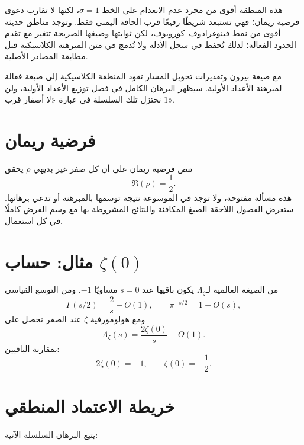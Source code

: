 هذه المنطقة أقوى من مجرد عدم الانعدام على الخط \(\sigma=1\)، لكنها
لا تقارب دعوى فرضية ريمان؛ فهي تستبعد شريطًا رفيعًا قرب الحافة اليمنى
فقط. وتوجد مناطق حديثة أقوى من نمط فينوغرادوف--كوروبوف، لكن ثوابتها
وصيغها الصريحة تتغير مع تقدم الحدود الفعالة؛ لذلك تُحفظ في سجل الأدلة
ولا تُدمج في متن المبرهنة الكلاسيكية قبل مطابقة المصادر الأصلية.

مع صيغة بيرون وتقديرات تحويل المسار تقود المنطقة الكلاسيكية إلى صيغة
فعالة لمبرهنة الأعداد الأولية. سيظهر البرهان الكامل في فصل توزيع
الأعداد الأولية، ولن نختزل تلك السلسلة في عبارة «لا أصفار قرب \(1\)».

\section{فرضية ريمان}

تنص فرضية ريمان على أن كل صفر غير بديهي \(\rho\) يحقق
\[
\Re(\rho)=\frac12.
\]
هذه مسألة مفتوحة، ولا توجد في الموسوعة نتيجة توسمها بالمبرهنة أو تدعي
برهانها. ستعرض الفصول اللاحقة الصيغ المكافئة والنتائج المشروطة بها مع
وسم الفرض كاملًا في كل استعمال.

\section{مثال: حساب \(\zeta(0)\)}

من الصيغة العالمية لـ\(\Lambda_\zeta\) يكون باقيها عند \(s=0\)
مساويًا \(-1\). ومن التوسع القياسي
\[
\Gamma(s/2)=\frac{2}{s}+O(1),
\qquad
\pi^{-s/2}=1+O(s),
\]
ومع هولومورفية \(\zeta\) عند الصفر نحصل على
\[
\Lambda_\zeta(s)
=
\frac{2\zeta(0)}{s}+O(1).
\]
بمقارنة الباقيين:
\[
2\zeta(0)=-1,
\qquad
\zeta(0)=-\frac12.
\]

\section{خريطة الاعتماد المنطقي}

يتبع البرهان السلسلة الآتية:

